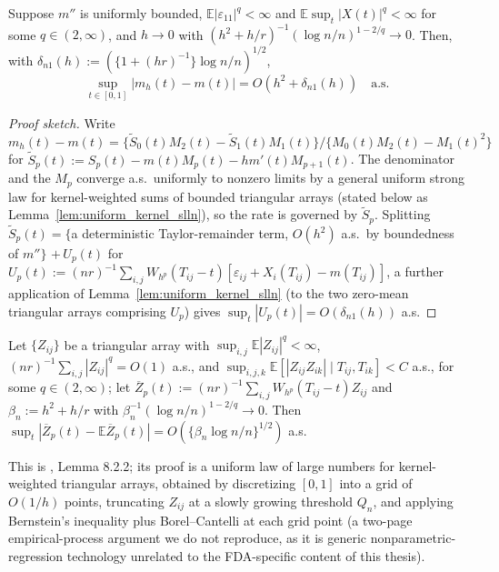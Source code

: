 \begin{theorem}
\label{thm:local_linear_mean_rate}
Suppose $m''$ is uniformly bounded, $\mathbb{E}|\varepsilon_{11}|^q<\infty$
and $\mathbb{E}\sup_t|X(t)|^q<\infty$ for some $q\in(2,\infty)$, and $h\to0$
with $(h^2+h/r)^{-1}(\log n/n)^{1-2/q}\to0$. Then, with
$\delta_{n1}(h):=(\{1+(hr)^{-1}\}\log n/n)^{1/2}$,
\begin{equation}
\sup_{t\in[0,1]}|m_h(t)-m(t)| = O(h^2+\delta_{n1}(h)) \quad\text{a.s.}
\label{eq:local_linear_mean_rate}
\end{equation}
\end{theorem}

\begin{proof}[Proof sketch]
Write $m_h(t)-m(t) = \{\widetilde S_0(t)M_2(t)-\widetilde S_1(t)M_1(t)\}/
\{M_0(t)M_2(t)-M_1(t)^2\}$ for $\widetilde S_p(t):=S_p(t)-m(t)M_p(t)-
hm'(t)M_{p+1}(t)$. The denominator and the $M_p$ converge a.s.\ uniformly
to nonzero limits by a general uniform strong law for kernel-weighted
sums of bounded triangular arrays (stated below as
Lemma~\ref{lem:uniform_kernel_slln}), so the rate is governed by
$\widetilde{S}_p$. Splitting $\widetilde{S}_p(t) = \{$a deterministic
Taylor-remainder term, $O(h^2)$ a.s.\ by boundedness of $m''\}$ $+\, U_p(t)$
for $U_p(t):=(nr)^{-1}\sum_{i,j}W_{h^p}(T_{ij}-t)[\varepsilon_{ij}+X_i
(T_{ij})-m(T_{ij})]$, a further application of
Lemma~\ref{lem:uniform_kernel_slln} (to the two zero-mean triangular arrays
comprising $U_p$) gives $\sup_t|U_p(t)| = O(\delta_{n1}(h))$ a.s.
\end{proof}

\begin{lemma}
\label{lem:uniform_kernel_slln}
Let $\{Z_{ij}\}$ be a triangular array with $\sup_{i,j}\mathbb{E}|Z_{ij}|^q
<\infty$, $(nr)^{-1}\sum_{i,j}|Z_{ij}|^q=O(1)$ a.s., and $\sup_{i,j,k}
\mathbb{E}[|Z_{ij}Z_{ik}|\mid T_{ij},T_{ik}]<C$ a.s., for some $q\in(2,
\infty)$; let $\overline{Z}_p(t):=(nr)^{-1}\sum_{i,j}W_{h^p}(T_{ij}-t)
Z_{ij}$ and $\beta_n:=h^2+h/r$ with $\beta_n^{-1}(\log n/n)^{1-2/q}\to0$.
Then $\sup_t|\overline{Z}_p(t)-\mathbb{E}\overline{Z}_p(t)| = O(\{\beta_n
\log n/n\}^{1/2})$ a.s.
\end{lemma}

This is \cite{hsingeubank2015}, Lemma 8.2.2; its proof is a uniform law of
large numbers for kernel-weighted triangular arrays, obtained by
discretizing $[0,1]$ into a grid of $O(1/h)$ points, truncating $Z_{ij}$ at
a slowly growing threshold $Q_n$, and applying Bernstein's inequality plus
Borel--Cantelli at each grid point (a two-page empirical-process argument
we do not reproduce, as it is generic nonparametric-regression technology
unrelated to the FDA-specific content of this thesis).

